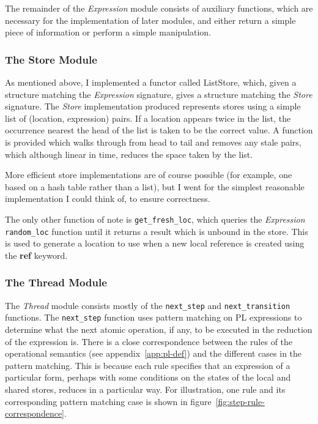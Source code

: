 \documentclass[12pt,a4paper,twoside,openright]{report}
\begin{document}
The remainder of the \emph{Expression} module
consists of auxiliary functions, which are
necessary for the implementation of later
modules, and either return a simple piece
of information or perform a simple manipulation.

\subsubsection{The Store Module}
As mentioned above, I implemented a functor
called ListStore, which, given a structure
matching the \emph{Expression} signature,
gives a structure matching the \emph{Store}
signature. The \emph{Store} implementation produced
represents stores using a simple list of
(location, expression) pairs. If a location
appears twice in the list, the occurrence
nearest the head of the list is taken to be
the correct value. A function is provided
which walks through from head to tail and
removes any stale pairs, which although
linear in time, reduces the space taken
by the list.

More efficient store implementations are of
course possible (for example, one based on
a hash table rather than a list), but
I went for the simplest reasonable
implementation I could think of, to
ensure correctness.

The only other function of note is
\texttt{get\_fresh\_loc},
which queries the \emph{Expression} \texttt{random\_loc}
function until it returns a result which is
unbound in the store. This is used to generate a location
to use when a new local reference is created using the
\textbf{ref} keyword.

\subsubsection{The Thread Module}
The \emph{Thread} module consists mostly of
the \texttt{next\_step} and \texttt{next\_transition}
functions. The \texttt{next\_step} function uses pattern
matching on PL expressions to determine what the next atomic
operation, if any, to be executed in the reduction
of the expression is. There is a close correspondence
between the
rules of the operational semantics (see appendix~\ref{app:pl-def})
and the different cases in the pattern matching. This is
because each rule specifies that an expression of a
particular form, perhaps with some conditions on the
states of the local and shared stores, reduces in a
particular way. For illustration, one rule and its
corresponding pattern matching case is shown in 
figure~\ref{fig:step-rule-correspondence}.
\end{document}
